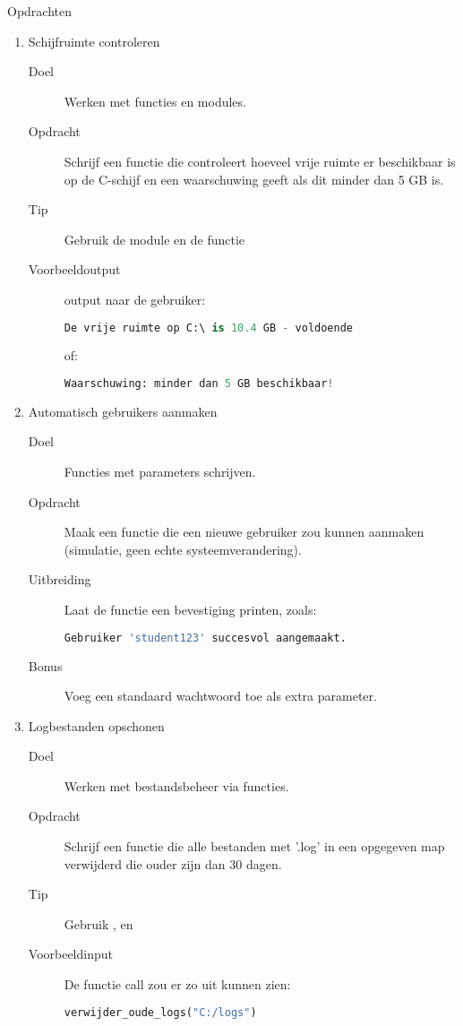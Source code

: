 Opdrachten
\begin{enumerate}
\item Schijfruimte controleren
	\begin{description}
	\item[Doel] Werken met functies en modules.
	\item[Opdracht] Schrijf een functie  die controleert hoeveel vrije ruimte er beschikbaar is op de C-schijf en een waarschuwing geeft als dit minder dan 5 GB is.
	\item[Tip] Gebruik de module  en de functie 
	\item[Voorbeeldoutput] output naar de gebruiker:
\begin{lstlisting}[language=python]
De vrije ruimte op C:\ is 10.4 GB - voldoende
\end{lstlisting}
of:
\begin{lstlisting}[language=python]
Waarschuwing: minder dan 5 GB beschikbaar!
\end{lstlisting}
	\end{description}

\item Automatisch gebruikers aanmaken
	\begin{description}
	\item[Doel] Functies met parameters schrijven.
	\item[Opdracht] Maak een functie  die een nieuwe gebruiker zou kunnen aanmaken (simulatie, geen echte systeemverandering).
	\item[Uitbreiding] Laat de functie een bevestiging printen, zoals:
\begin{lstlisting}[language=python]
Gebruiker 'student123' succesvol aangemaakt.
\end{lstlisting}
	\item[Bonus] Voeg een standaard wachtwoord toe als extra parameter.
	\end{description}

\item Logbestanden opschonen
	\begin{description}
	\item[Doel] Werken met bestandsbeheer via functies.
	\item[Opdracht] Schrijf een functie  die alle bestanden met '.log' in een opgegeven map verwijderd die ouder zijn dan 30 dagen.
	\item[Tip] Gebruik ,  en 
	\item[Voorbeeldinput] De functie call zou er zo uit kunnen zien:
\begin{lstlisting}[language=python]
verwijder_oude_logs("C:/logs")
\end{lstlisting}
	\end{description}


\end{enumerate}
